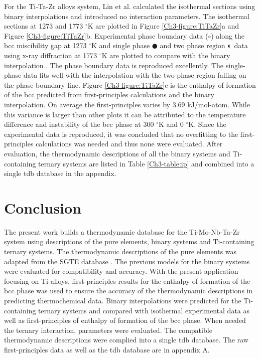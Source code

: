 For the Ti-Ta-Zr alloys system, Lin et al. \cite{Lin1996} calculated the isothermal sections using binary interpolations and introduced no interaction parameters. The isothermal sections at 1273 and 1773 $^\circ$K are plotted in Figure \ref{Ch3-figure:TiTaZr}a and Figure \ref{Ch3-figure:TiTaZr}b. Experimental phase boundary data ($\circ$) along the bcc miscibility gap at 1273 $^\circ$K and single phase $\CIRCLE$ and two phase region $\LEFTcircle$ data using x-ray diffraction at 1773 $^\circ$K are plotted to compare with the binary interpolation \cite{Lin1996,Hoch1964}. The phase boundary data is reproduced excellently. The single-phase data fits well with the interpolation with the two-phase region falling on the phase boundary line. Figure \ref{Ch3-figure:TiTaZr}c is the enthalpy of formation of the bcc predicted from first-principles calculations and the binary interpolation. On average the first-principles varies by 3.69 kJ/mol-atom. While this variance is larger than other plots it can be attributed to the temperature difference and instability of the bcc phase at 300 $^\circ$K and 0 $^\circ$K. Since the experimental data is reproduced, it was concluded that no overfitting to the first-principles calculations was needed and thus none were evaluated. 
After evaluation, the thermodynamic descriptions of all the binary systems and Ti-containing ternary systems are listed in Table \ref{Ch3-table:ip} and combined into a single tdb database in the appendix.

\section{Conclusion}

The present work builds a thermodynamic database for the Ti-Mo-Nb-Ta-Zr system using descriptions of the pure elements, binary systems and Ti-containing ternary systems. The thermodynamic descriptions of the pure elements was adapted from the SGTE database \cite{Dinsdale1991}. The previous models for the binary systems were evaluated for compatibility and accuracy. With the present application focusing on Ti-alloys, first-principles results for the enthalpy of formation of the bcc phase was used to ensure the accuracy of the thermodynamic descriptions in predicting thermochemical data. Binary interpolations were predicted for the Ti-containing ternary systems and compared with isothermal experimental data as well as first-principles of enthalpy of formation of the bcc phase. When needed the ternary interaction, parameters were evaluated. The compatible thermodynamic descriptions were complied into a single tdb database. The raw first-principles data as well as the tdb database are in appendix A. 


